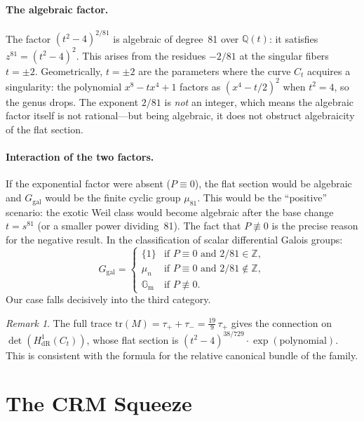 \documentclass[11pt]{article}
\theoremstyle{plain}
\theoremstyle{definition}
\theoremstyle{remark}
\newtheorem{remark}[theorem]{Remark}
\newcommand{\Z}{\mathbb{Z}}
\newcommand{\Q}{\mathbb{Q}}
\newcommand{\tr}{\mathrm{tr}}
\newcommand{\Ggal}{G_{\mathrm{gal}}}
\newcommand{\Gm}{\mathbb{G}_{\mathrm{m}}}
\begin{document}
\paragraph{The algebraic factor.}
The factor $(t^2 - 4)^{2/81}$ is algebraic of degree~81 over $\Q(t)$:
it satisfies $z^{81} = (t^2 - 4)^2$. This arises from the residues
$-2/81$ at the singular fibers $t = \pm 2$. Geometrically, $t = \pm 2$
are the parameters where the curve $C_t$ acquires a singularity: the
polynomial $x^8 - tx^4 + 1$ factors as $(x^4 - t/2)^2$ when $t^2 = 4$,
so the genus drops. The exponent $2/81$ is \emph{not} an integer, which
means the algebraic factor itself is not rational---but being algebraic,
it does not obstruct algebraicity of the flat section.

\paragraph{Interaction of the two factors.}
If the exponential factor were absent ($P \equiv 0$), the flat section
would be algebraic and $\Ggal$ would be the finite cyclic group $\mu_{81}$.
This would be the ``positive'' scenario: the exotic Weil class would become
algebraic after the base change $t = s^{81}$ (or a smaller power dividing~81).
The fact that $P \not\equiv 0$ is the precise reason for the negative result.
In the classification of scalar differential Galois groups:
\[
\Ggal = \begin{cases}
\{1\} & \text{if } P \equiv 0 \text{ and } 2/81 \in \Z, \\
\mu_n & \text{if } P \equiv 0 \text{ and } 2/81 \notin \Z, \\
\Gm & \text{if } P \not\equiv 0.
\end{cases}
\]
Our case falls decisively into the third category.

\begin{remark}
The full trace $\tr(M) = \tau_+ + \tau_- = \tfrac{19}{9}\, \tau_+$ gives
the connection on $\det(H^1_{\mathrm{dR}}(C_t))$, whose flat section is
$(t^2 - 4)^{38/729} \cdot \exp(\text{polynomial})$. This is consistent
with the formula for the relative canonical bundle of the family.
\end{remark}

\section{The CRM Squeeze}
\end{document}

